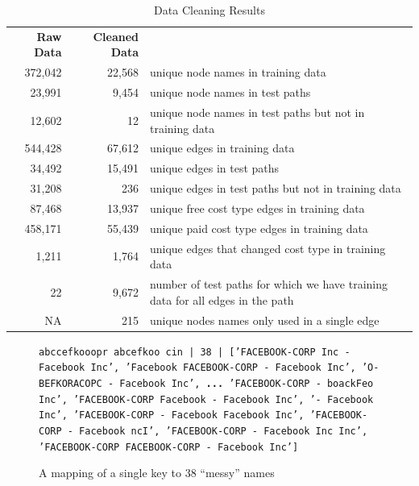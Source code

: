 \documentclass{article} %
\begin{document}
\begin{table}
\begin{tabular}{rrl} 
\textbf{Raw Data} & \textbf{Cleaned Data} & \\
372,042 & 22,568 & unique node names in training data \\ 
23,991 & 9,454 & unique node names in test paths\\
12,602 & 12 & unique node names in test paths but not in training data\\
544,428 & 67,612 & unique edges in training data \\
34,492 & 15,491 & unique edges in test paths \\
31,208 & 236 & unique edges in test paths but not in training data \\
87,468 & 13,937 & unique free cost type edges in training data \\
458,171 & 55,439 & unique paid cost type edges in training data \\
1,211 & 1,764 & unique edges that changed cost type in training data \\
22 & 9,672 & number of test paths for which we have training data for all edges
in the path \\
NA & 215 & unique nodes names only used in a single edge \\
\end{tabular}
\caption{Data Cleaning Results}
\label{tab:clean}
\end{table}

\begin{figure}
\texttt{abccefkooopr abcefkoo cin | 38 | ['FACEBOOK-CORP Inc - Facebook Inc', 'Facebook FACEBOOK-CORP - Facebook Inc', 'O-BEFKORACOPC - Facebook Inc', \textbf{...} 'FACEBOOK-CORP - boackFeo Inc', 'FACEBOOK-CORP Facebook - Facebook Inc', '- Facebook Inc', 'FACEBOOK-CORP - Facebook Facebook Inc', 'FACEBOOK-CORP - Facebook ncI', 'FACEBOOK-CORP - Facebook Inc Inc', 'FACEBOOK-CORP FACEBOOK-CORP - Facebook Inc']}
\caption{A mapping of a single key to 38 ``messy'' names}
\label{fig:mess}
\end{figure}
\end{document}
